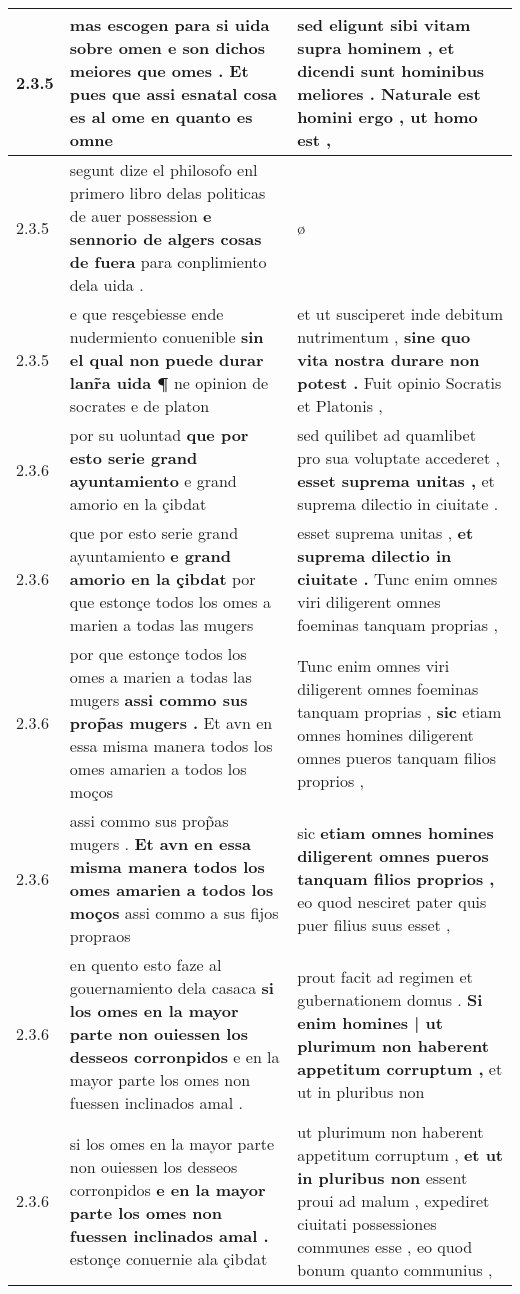 \begin{tabular}{|p{1cm}|p{6.5cm}|p{6.5cm}|}
2.3.5 & mas escogen para si uida sobre omen \textbf{ e son dichos meiores que omes . Et pues que assi esnatal cosa es al ome } en quanto es omne & sed eligunt sibi vitam supra hominem , \textbf{ et dicendi sunt hominibus meliores . Naturale est homini ergo , } ut homo est , \\\hline
2.3.5 & segunt dize el philosofo enl primero libro delas politicas de auer possession \textbf{ e sennorio de algers cosas de fuera } para conplimiento dela uida . & ø \\\hline
2.3.5 & e que resçebiesse ende nudermiento conuenible \textbf{ sin el qual non puede durar lanr̃a uida ¶ } ne opinion de socrates e de platon & et ut susciperet inde debitum nutrimentum , \textbf{ sine quo vita nostra durare non potest . } Fuit opinio Socratis et Platonis , \\\hline
2.3.6 & por su uoluntad \textbf{ que por esto serie grand ayuntamiento } e grand amorio en la çibdat & sed quilibet ad quamlibet pro sua voluptate accederet , \textbf{ esset suprema unitas , } et suprema dilectio in ciuitate . \\\hline
2.3.6 & que por esto serie grand ayuntamiento \textbf{ e grand amorio en la çibdat } por que estonçe todos los omes a marien a todas las mugers & esset suprema unitas , \textbf{ et suprema dilectio in ciuitate . } Tunc enim omnes viri diligerent omnes foeminas tanquam proprias , \\\hline
2.3.6 & por que estonçe todos los omes a marien a todas las mugers \textbf{ assi commo sus prop̃as mugers . } Et avn en essa misma manera todos los omes amarien a todos los moços & Tunc enim omnes viri diligerent omnes foeminas tanquam proprias , \textbf{ sic } etiam omnes homines diligerent omnes pueros tanquam filios proprios , \\\hline
2.3.6 & assi commo sus prop̃as mugers . \textbf{ Et avn en essa misma manera todos los omes amarien a todos los moços } assi commo a sus fijos propraos & sic \textbf{ etiam omnes homines diligerent omnes pueros tanquam filios proprios , } eo quod nesciret pater quis puer filius suus esset , \\\hline
2.3.6 & en quento esto faze al gouernamiento dela casaca \textbf{ si los omes en la mayor parte non ouiessen los desseos corronpidos } e en la mayor parte los omes non fuessen inclinados amal . & prout facit ad regimen et gubernationem domus . \textbf{ Si enim homines | ut plurimum non haberent appetitum corruptum , } et ut in pluribus non \\\hline
2.3.6 & si los omes en la mayor parte non ouiessen los desseos corronpidos \textbf{ e en la mayor parte los omes non fuessen inclinados amal . } estonçe conuernie ala çibdat & ut plurimum non haberent appetitum corruptum , \textbf{ et ut in pluribus non } essent proui ad malum , expediret ciuitati possessiones communes esse , eo quod bonum quanto communius , \\\hline

\end{tabular}
